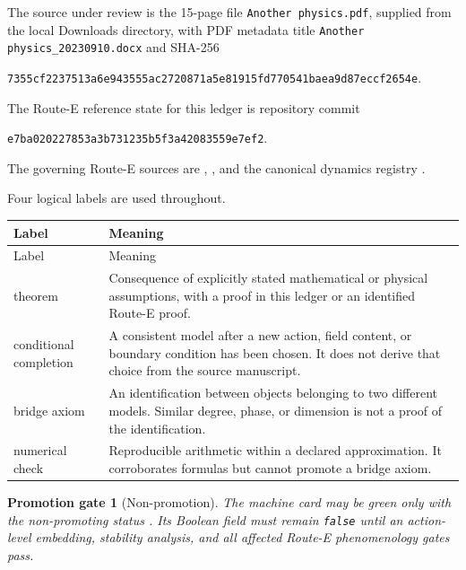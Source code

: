 \documentclass[11pt]{article}
\numberwithin{equation}{section}
\newcommand{\status}[1]{\textsf{#1}}
\newtheorem{gate}[theorem]{Promotion gate}
\begin{document}
The source under review is the 15-page file
\texttt{Another physics.pdf}, supplied from the local Downloads directory,
with PDF metadata title
\texttt{Another physics\_20230910.docx} and SHA-256
\begin{center}
\small\texttt{7355cf2237513a6e943555ac2720871a5e81915fd770541baea9d87eccf2654e}.
\end{center}
The Route-E reference state for this ledger is repository commit
\begin{center}
\small\texttt{e7ba020227853a3b731235b5f3a42083559e7ef2}.
\end{center}
The governing Route-E sources are ,
, and the canonical
dynamics registry .

Four logical labels are used throughout.

\begin{longtable}{>{\raggedright\arraybackslash}p{}
                  >{\raggedright\arraybackslash}p{}}
\toprule
Label & Meaning \\
\midrule
\endfirsthead
\toprule
Label & Meaning \\
\midrule
\endhead
\status{theorem} & Consequence of explicitly stated mathematical or physical
assumptions, with a proof in this ledger or an identified Route-E proof.\\
\status{conditional completion} & A consistent model after a new action,
field content, or boundary condition has been chosen.  It does not derive
that choice from the source manuscript.\\
\status{bridge axiom} & An identification between objects belonging to two
different models.  Similar degree, phase, or dimension is not a proof of the
identification.\\
\status{numerical check} & Reproducible arithmetic within a declared
approximation.  It corroborates formulas but cannot promote a bridge axiom.\\
\bottomrule
\end{longtable}

\begin{gate}[Non-promotion]
The machine card may be green only with the non-promoting status
.  Its Boolean
field  must remain \texttt{false}
until an action-level embedding, stability analysis, and all affected Route-E
phenomenology gates pass.
\end{gate}
\end{document}
